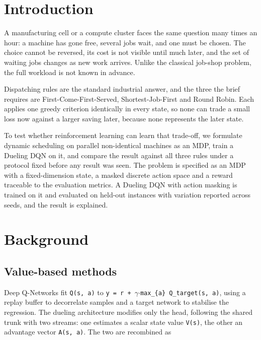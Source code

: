 \section{Introduction}\label{introduction}

A manufacturing cell or a compute cluster faces the same question many times an hour: a machine has
gone free, several jobs wait, and one must be chosen. The choice cannot be reversed, its cost is not
visible until much later, and the set of waiting jobs changes as new work arrives. Unlike the classical job-shop problem, the full workload is not known in advance.

Dispatching rules are the standard industrial answer, and the three the brief requires are
First-Come-First-Served, Shortest-Job-First and Round Robin. Each applies one greedy criterion
identically in every state, so none can trade a small loss now against a larger saving later,
because none represents the later state.

To test whether reinforcement learning can learn that trade-off, we formulate dynamic scheduling
on parallel non-identical machines as an MDP, train a Dueling DQN on it, and compare the result
against all three rules under a protocol fixed before any result was seen. The problem is specified as an MDP
with a fixed-dimension state, a masked discrete action space and a reward traceable to the
evaluation metrics. A Dueling DQN with action masking is trained on it and evaluated on held-out
instances with variation reported across seeds, and the result is explained.

\section{Background}\label{background}

\subsection{Value-based methods}\label{value-based-deep-reinforcement-learning}

Deep Q-Networks \citep{mnih2015} fit \texttt{Q(s,\ a)} to \texttt{y\ =\ r\ +\ $\gamma$$\cdot$max\_\{a\textquotesingle{}\}\ Q\_target(s\textquotesingle{},\ a\textquotesingle{})}, using a
replay buffer to decorrelate samples and a target network to stabilise the regression. The dueling
architecture \citep{wang2016dueling} modifies only the head, following the shared trunk with two
streams: one estimates a scalar state value \texttt{V(s)}, the other an advantage vector \texttt{A(s,\ a)}. The two
are recombined as

